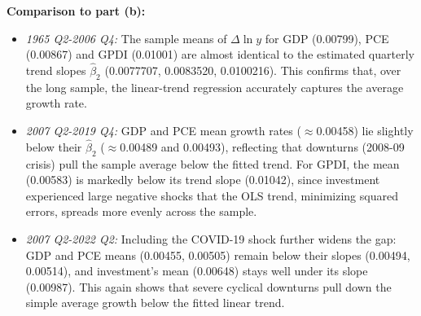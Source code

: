 \documentclass[a4paper,12pt]{article} %
\theoremstyle{nonitalic}
\newenvironment{solution}[1]
  {\renewcommand\theinnercustomsol{#1}%
   \innercustomsol}
  {\endinnercustomsol}
\newcounter{solutionctr}[section]
\renewcommand{\thesolutionctr}{(\alph{solutionctr})}
\newenvironment{autosolution}
  {\refstepcounter{solutionctr}%
   \begin{solution}{\thesolutionctr}}
  {\end{solution}}
\begin{document}
\begin{autosolution}
    \textbf{Comparison to part (b):}
    \begin{itemize}
        \item \emph{1965 Q2-2006 Q4:} The sample means of $\Delta\ln y$ for GDP (0.00799), PCE (0.00867) and GPDI (0.01001) are almost identical to the estimated quarterly trend slopes $\hat\beta_2$ (0.0077707, 0.0083520, 0.0100216). 
        This confirms that, over the long sample, the linear-trend regression accurately captures the average growth rate.
        \item \emph{2007 Q2-2019 Q4:} GDP and PCE mean growth rates ($\approx$0.00458) lie slightly below their $\hat\beta_2$ ($\approx$0.00489 and 0.00493), reflecting that downturns (2008-09 crisis) pull the sample average below the fitted trend. 
        For GPDI, the mean (0.00583) is markedly below its trend slope (0.01042), since investment experienced large negative shocks that the OLS trend, minimizing squared errors, spreads more evenly across the sample.
        \item \emph{2007 Q2-2022 Q2:} Including the COVID-19 shock further widens the gap: GDP and PCE means (0.00455, 0.00505) remain below their slopes (0.00494, 0.00514), and investment's mean (0.00648) stays well under its slope (0.00987). 
        This again shows that severe cyclical downturns pull down the simple average growth below the fitted linear trend.
    \end{itemize}
\end{autosolution}
\end{document}
